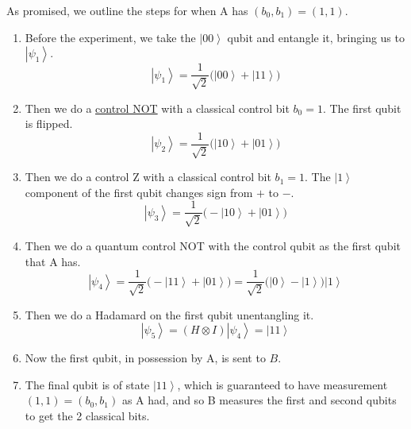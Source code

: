 \documentclass{article}
\newcommand{\ket}[1]{\ensuremath{\left|#1\right\rangle}}
\newcounter{example}[section]
\begin{document}
    \begin{example}
      \label{ex:superdense-coding-with-two-classical-1-bits}
      As promised, we outline the steps for when A has $(b_0, b_1) = (1, 1)$.
      \begin{enumerate} 
        \item Before the experiment, we take the $\ket{00}$ qubit and entangle it, bringing us to $\ket{\psi_1}$. 
          \begin{equation} 
            \ket{\psi_1} = \frac{1}{\sqrt{2}} \big( \ket{00} + \ket{11} \big)
          \end{equation}
        \item Then we do a \hyperref[def:control-not]{control NOT} with a classical control bit $b_0 = 1$. The first qubit is flipped. 
          \begin{equation} 
            \ket{\psi_2} = \frac{1}{\sqrt{2}} \big( \ket{10} + \ket{01} \big)
          \end{equation}
        \item Then we do a control Z with a classical control bit $b_1 = 1$. The $\ket{1}$ component of the first qubit changes sign from $+$ to $-$. 
          \begin{equation} 
            \ket{\psi_3} = \frac{1}{\sqrt{2}} \big( - \ket{10} + \ket{01} \big)
          \end{equation}
        \item Then we do a quantum control NOT with the control qubit as the first qubit that A has. 
          \begin{equation} 
            \ket{\psi_4} = \frac{1}{\sqrt{2}} \big( -\ket{11} + \ket{01} \big) = \frac{1}{\sqrt{2}} \big( \ket{0} - \ket{1} \big) \ket{1}
          \end{equation}
        \item Then we do a Hadamard on the first qubit unentangling it. 
          \begin{equation} 
            \ket{\psi_5} = (H \otimes I) \ket{\psi_4} = \ket{11}
          \end{equation}
        \item Now the first qubit, in possession by A, is sent to $B$. 
        \item The final qubit is of state $\ket{11}$, which is guaranteed to have measurement $(1, 1) = (b_0, b_1)$ as A had, and so B measures the first and second qubits to get the 2 classical bits. 
      \end{enumerate}
    \end{example}
\end{document}

